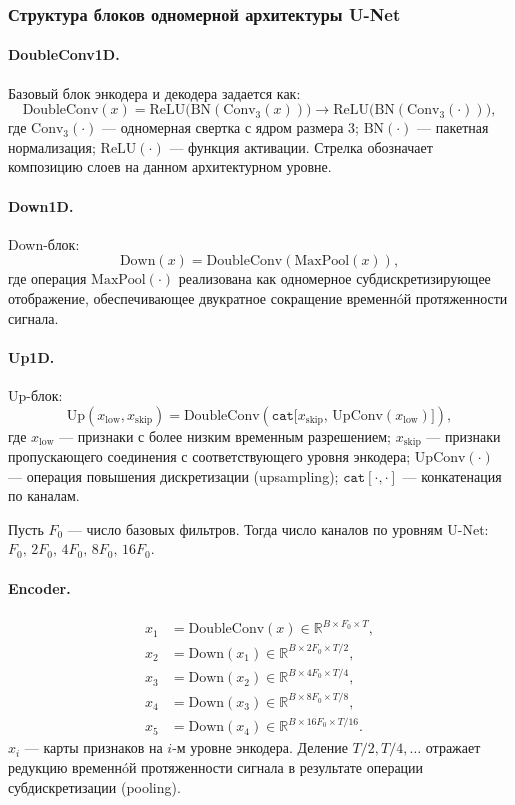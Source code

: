 \documentclass[10pt,a4paper]{book}
\begin{document}
\subsubsection{Структура блоков одномерной архитектуры U-Net}

\paragraph{DoubleConv1D.}
Базовый блок энкодера и декодера задается как:
\[
\text{DoubleConv}(x)=
\text{ReLU}\big(\text{BN}(\text{Conv}_{3}(x))\big)
\rightarrow
\text{ReLU}\big(\text{BN}(\text{Conv}_{3}(\cdot))\big),
\]
где $\text{Conv}_{3}(\cdot)$ --- одномерная свертка с ядром размера 3; $\text{BN}(\cdot)$ --- пакетная нормализация; $\text{ReLU}(\cdot)$ --- функция активации. Стрелка обозначает композицию слоев на данном архитектурном уровне.

\paragraph{Down1D.}
Down-блок:
\[
\text{Down}(x) = \text{DoubleConv}(\text{MaxPool}(x)),
\]
где операция $\text{MaxPool}(\cdot)$ реализована как одномерное субдискретизирующее отображение, обеспечивающее двукратное сокращение временнóй протяженности сигнала.

\paragraph{Up1D.}
Up-блок:
\[
\text{Up}(x_{\text{low}}, x_{\text{skip}}) =
\text{DoubleConv}\left(\texttt{cat}\big[x_{\text{skip}},\, \text{UpConv}(x_{\text{low}})\big]\right),
\]
где $x_{\text{low}}$ --- признаки с более низким временным разрешением; $x_{\text{skip}}$ --- признаки пропускающего соединения с соответствующего уровня энкодера; $\text{UpConv}(\cdot)$ --- операция повышения дискретизации (upsampling); $\texttt{cat}[\cdot,\cdot]$ --- конкатенация по каналам.

Пусть $F_0$ --- число базовых фильтров. Тогда число каналов по уровням U-Net: $F_0,\,2F_0,\,4F_0,\,8F_0,\,16F_0$.

\paragraph{Encoder.}
\begin{align*}
x_1 &= \text{DoubleConv}(x) \in \mathbb{R}^{B \times F_0 \times T},\\
x_2 &= \text{Down}(x_1) \in \mathbb{R}^{B \times 2F_0 \times T/2},\\
x_3 &= \text{Down}(x_2) \in \mathbb{R}^{B \times 4F_0 \times T/4},\\
x_4 &= \text{Down}(x_3) \in \mathbb{R}^{B \times 8F_0 \times T/8},\\
x_5 &= \text{Down}(x_4) \in \mathbb{R}^{B \times 16F_0 \times T/16}.
\end{align*}
$x_i$ --- карты признаков на $i$-м уровне энкодера. Деление $T/2, T/4, \dots$ отражает редукцию временнóй протяженности сигнала в результате операции субдискретизации (pooling).
\end{document}
